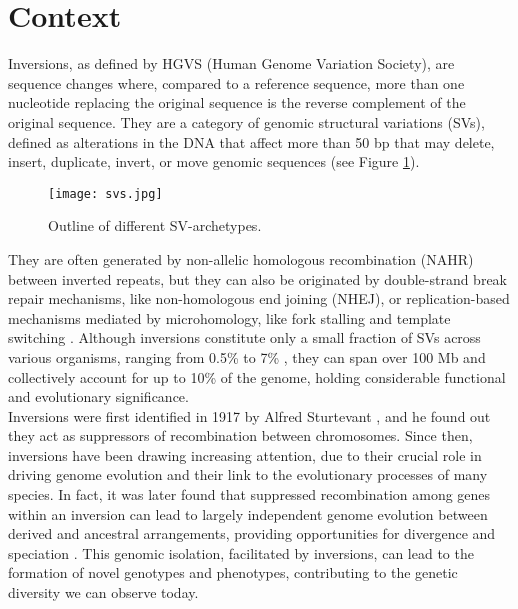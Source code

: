 \section{Context} 

Inversions, as defined by HGVS \cite{noauthor_inversion_nodate} (Human Genome Variation Society), are sequence changes where, compared to a reference sequence, more than one nucleotide replacing the original sequence is the reverse complement of the original sequence. They are a category of genomic structural variations (SVs), defined as alterations in the DNA that affect more than 50 bp that may delete, insert, duplicate, invert, or move genomic sequences \cite{eslami_rasekh_discovery_2017} (see Figure \ref{fig:svs}). 

\begin{figure}[h]

  \centering
    \texttt{[image: svs.jpg]}

  \caption{Outline of different SV-archetypes.}
  \label{fig:svs}
\end{figure}

They are often generated by non-allelic homologous recombination (NAHR) between inverted repeats, but they can also be originated by double-strand break repair mechanisms, like non-homologous end joining (NHEJ), or replication-based mechanisms mediated by microhomology, like fork stalling and template switching \cite{puig_human_2015}. Although inversions constitute only a small fraction of SVs across various organisms, ranging from 0.5\% to 7\% \cite{hu_unravelling_2024}, they can span over 100 Mb and collectively account for up to 10\% of the genome, holding considerable functional and evolutionary significance. \\


Inversions were first identified in 1917 by Alfred Sturtevant \cite{sturtevant_case_1921}, and he found out they act as suppressors of recombination between chromosomes. Since then, inversions have been drawing increasing attention, due to their crucial role in driving genome evolution and their link to the evolutionary processes of many species. In fact, it was later found that suppressed recombination among genes within an inversion can lead to largely independent genome evolution between derived and ancestral arrangements, providing opportunities for divergence and speciation \cite{faria_evolving_2019}. This genomic isolation, facilitated by inversions, can lead to the formation of novel genotypes and phenotypes, contributing to the genetic diversity we can observe today. \\


